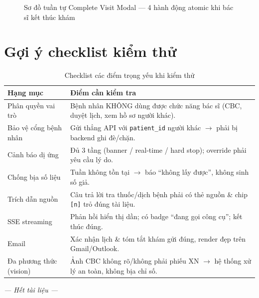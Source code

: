 \documentclass[a4paper,12pt]{article}
\begin{document}
\begin{figure}[H]
{%
}
\caption{Sơ đồ tuần tự Complete Visit Modal --- 4 hành động atomic khi bác sĩ kết thúc khám}
\label{fig:seq-flow-complete}
\end{figure}

\section{Gợi ý checklist kiểm thử}

\begin{table}[H]
\centering
\begin{tabular}{|p{5.2cm}|p{8cm}|}
\hline
\textbf{Hạng mục} & \textbf{Điểm cần kiểm tra} \\
\hline
Phân quyền vai trò & Bệnh nhân KHÔNG dùng được chức năng bác sĩ (CBC, duyệt lịch, xem hồ sơ người khác). \\ \hline
Bảo vệ cổng bệnh nhân & Gửi thẳng API với \texttt{patient\_id} người khác $\to$ phải bị backend ghi đè/chặn. \\ \hline
Cảnh báo dị ứng & Đủ 3 tầng (banner / real-time / hard stop); override phải yêu cầu lý do. \\ \hline
Chống bịa số liệu & Tuần không tồn tại $\to$ báo ``không lấy được'', không sinh số giả. \\ \hline
Trích dẫn nguồn & Câu trả lời tra thuốc/dịch bệnh phải có thẻ nguồn \& chip \texttt{[n]} trỏ đúng tài liệu. \\ \hline
SSE streaming & Phản hồi hiển thị dần; có badge ``đang gọi công cụ''; kết thúc đúng. \\ \hline
Email & Xác nhận lịch \& tóm tắt khám gửi đúng, render đẹp trên Gmail/Outlook. \\ \hline
Đa phương thức (vision) & Ảnh CBC không rõ/không phải phiếu XN $\to$ hệ thống xử lý an toàn, không bịa chỉ số. \\ \hline
\end{tabular}
\caption{Checklist các điểm trọng yếu khi kiểm thử}
\end{table}

\vspace{1cm}
\noindent\textit{--- Hết tài liệu ---}
\end{document}
